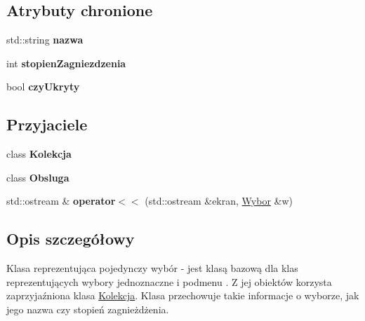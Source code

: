 \subsection*{Atrybuty chronione}
\begin{DoxyCompactItemize}
\item 
\hypertarget{classWybor_ada1632e8ce78ba40ea8f491f2db66b77}{std\-::string {\bfseries nazwa}}\label{classWybor_ada1632e8ce78ba40ea8f491f2db66b77}

\item 
\hypertarget{classWybor_aee3503d5cc003f8dd73547fe4e58cef9}{int {\bfseries stopien\-Zagniezdzenia}}\label{classWybor_aee3503d5cc003f8dd73547fe4e58cef9}

\item 
\hypertarget{classWybor_a946727299ecc881dc13ac30e1d9f33d8}{bool {\bfseries czy\-Ukryty}}\label{classWybor_a946727299ecc881dc13ac30e1d9f33d8}

\end{DoxyCompactItemize}
\subsection*{Przyjaciele}
\begin{DoxyCompactItemize}
\item 
\hypertarget{classWybor_acbfbc86fbec88d567dc6313b7419d6fa}{class {\bfseries Kolekcja}}\label{classWybor_acbfbc86fbec88d567dc6313b7419d6fa}

\item 
\hypertarget{classWybor_aaba4100c363553c323b55344e224e15d}{class {\bfseries Obsluga}}\label{classWybor_aaba4100c363553c323b55344e224e15d}

\item 
\hypertarget{classWybor_a1181e1d648ce67ab4f131a6f1639c6fd}{std\-::ostream \& {\bfseries operator$<$$<$} (std\-::ostream \&ekran, \hyperlink{classWybor}{Wybor} \&w)}\label{classWybor_a1181e1d648ce67ab4f131a6f1639c6fd}

\end{DoxyCompactItemize}


\subsection{Opis szczegółowy}
Klasa reprezentująca pojedynczy wybór -\/ jest klasą bazową dla klas reprezentujących wybory jednoznaczne i podmenu . Z jej obiektów korzysta zaprzyjaźniona klasa \hyperlink{classKolekcja}{Kolekcja}. Klasa przechowuje takie informacje o wyborze, jak jego nazwa czy stopień zagnieżdżenia. 